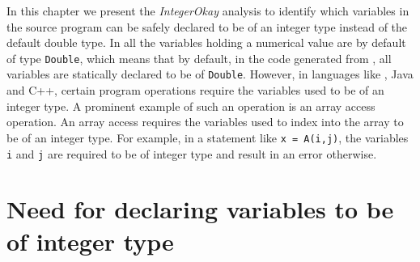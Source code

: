 %

In this chapter we present the \emph{IntegerOkay} analysis to identify
which variables in the source \matlab program can be safely declared to
be of an integer type instead of the default double type. In \matlab all
the variables holding a numerical value are by default of type
\texttt{Double}, which means that by default, in the \xten code
generated from \matlab, all variables are statically declared to be of
\texttt{Double}. However, in languages like \xten, Java and C++, certain
program operations require the variables used to be of an integer type.
A prominent example of such an operation is an array access operation.
An array access requires the variables used to index into the array to
be of an integer type. For example, in a statement like \texttt{x =
A(i,j)}, the variables \texttt{i} and \texttt{j} are required to be of
integer type and result in an error otherwise.

\section{Need for declaring variables to be of integer type}

